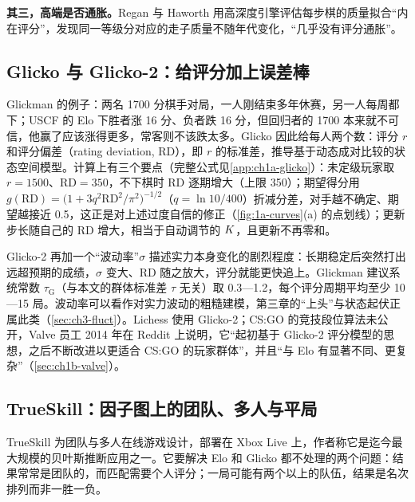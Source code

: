 \textbf{其三，高端是否通胀。}Regan 与 Haworth 用高深度引擎评估每步棋的质量拟合“内在评分”，发现同一等级分对应的走子质量不随年代变化，“几乎没有评分通胀”\cite{regan2011intrinsic}\tagLit。

\subsection{Glicko 与 Glicko-2：给评分加上误差棒}\label{sec:1a-glicko}

Glickman 的例子：两名 1700 分棋手对局，一人刚结束多年休赛，另一人每周都下；USCF 的 Elo 下胜者涨 16 分、负者跌 16 分，但回归者的 1700 本来就不可信，他赢了应该涨得更多，常客则不该跌太多\cite{glickman2016glicko}\tagLit。Glicko 因此给每人两个数：评分 $r$ 和评分偏差（rating deviation, RD），即 $r$ 的标准差，推导基于动态成对比较的状态空间模型\cite{glickman1999parameter}\tagLit。计算上有三个要点（完整公式见\cref{app:ch1a-glicko}）：未定级玩家取 $r=1500$、RD$=350$，不下棋时 RD 逐期增大（上限 350）；期望得分用 $g(\mathrm{RD})=\big(1+3q^2\mathrm{RD}^2/\pi^2\big)^{-1/2}$（$q=\ln10/400$）折减分差，对手越不确定、期望越接近 0.5，这正是对上述过度自信的修正（\cref{fig:1a-curves}(a) 的点划线）；更新步长随自己的 RD 增大，相当于自动调节的 $K$，且更新不再零和\cite{glickman2016glicko}\tagLit。

Glicko-2 再加一个“波动率”$\sigma$ 描述实力本身变化的剧烈程度：长期稳定后突然打出远超预期的成绩，$\sigma$ 变大、RD 随之放大，评分就能更快追上\cite{glickman2001dynamic}\tagLit。Glickman 建议系统常数 $\tau_{\mathrm G}$（与本文的群体标准差 $\tau$ 无关）取 0.3—1.2，每个评分周期平均至少 10—15 局\cite{glickman2022example}\tagLit。波动率可以看作对实力波动的粗糙建模，第三章的“上头”与状态起伏正属此类（\cref{sec:ch3-fluct}）。Lichess 使用 Glicko-2\cite{chowdhary2023quantifying}\tagLit；CS:GO 的竞技段位算法未公开，Valve 员工 2014 年在 Reddit 上说明，它“起初基于 Glicko-2 评分模型的思想，之后不断改进以更适合 CS:GO 的玩家群体”，并且“与 Elo 有显著不同、更复杂”\cite{vitaliy2014comment}\tagOff（\cref{sec:ch1b-valve}）。

\subsection{TrueSkill：因子图上的团队、多人与平局}\label{sec:1a-trueskill}

TrueSkill 为团队与多人在线游戏设计，部署在 Xbox Live 上，作者称它是迄今最大规模的贝叶斯推断应用之一\cite{herbrich2006trueskill}\tagLit。它要解决 Elo 和 Glicko 都不处理的两个问题：结果常常是团队的，而匹配需要个人评分；一局可能有两个以上的队伍，结果是名次排列而非一胜一负。

